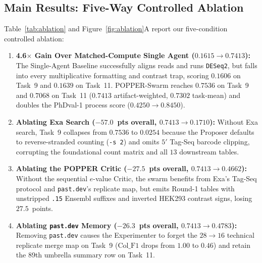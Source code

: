\documentclass[10pt,twocolumn]{article}
\begin{document}
\subsection{Main Results: Five-Way Controlled Ablation}
Table~\ref{tab:ablation} and Figure~\ref{fig:ablation}A report our five-condition controlled ablation:
\begin{enumerate}[leftmargin=14pt,itemsep=2pt]
    \item \textbf{4.6$\times$ Gain Over Matched-Compute Single Agent ($0.1615 \rightarrow 0.7413$):} The Single-Agent Baseline successfully aligns reads and runs \texttt{DESeq2}, but falls into every multiplicative formatting and contrast trap, scoring $0.1606$ on Task~9 and $0.1639$ on Task~11. POPPER-Swarm reaches $\mathbf{0.7536}$ on Task~9 and $\mathbf{0.7068}$ on Task~11 ($\mathbf{0.7413}$ artifact-weighted, $\mathbf{0.7302}$ task-mean) and doubles the PhDval-1 process score ($0.4250 \rightarrow \mathbf{0.8450}$).
    \item \textbf{Ablating Exa Search ($-57.0$~pts overall, $0.7413 \rightarrow 0.1710$):} Without Exa search, Task~9 collapses from $0.7536$ to $0.0254$ because the Proposer defaults to reverse-stranded counting (\texttt{-s 2}) and omits $5'$ Tag-Seq barcode clipping, corrupting the foundational count matrix and all $13$ downstream tables.
    \item \textbf{Ablating the POPPER Critic ($-27.5$~pts overall, $0.7413 \rightarrow 0.4662$):} Without the sequential $e$-value Critic, the swarm benefits from Exa's Tag-Seq protocol and \texttt{past.dev}'s replicate map, but emits Round-1 tables with unstripped \texttt{.15} Ensembl suffixes and inverted HEK293 contrast signs, losing $27.5$~points.
    \item \textbf{Ablating \texttt{past.dev} Memory ($-26.3$~pts overall, $0.7413 \rightarrow 0.4783$):} Removing \texttt{past.dev} causes the Experimenter to forget the $28 \to 16$ technical replicate merge map on Task~9 ($\text{Col\_F1}$ drops from $1.00$ to $0.46$) and retain the 89th umbrella summary row on Task~11.
\end{enumerate}
\end{document}
